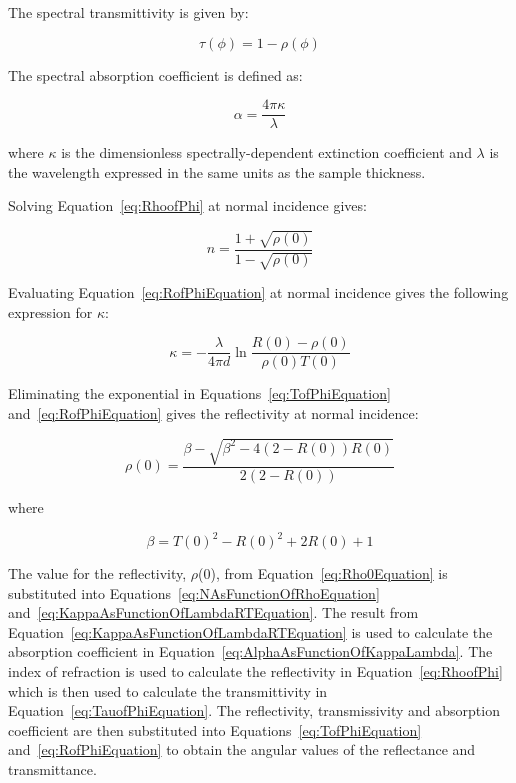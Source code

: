 The spectral transmittivity is given by:

\begin{equation}
\tau (\phi ) = 1 - \rho (\phi )
\label{eq:TauofPhiEquation}
\end{equation}

The spectral absorption coefficient is defined as:

\begin{equation}
\alpha  = \frac{4 \pi \kappa}{\lambda}
\label{eq:AlphaAsFunctionOfKappaLambda}
\end{equation}

where \(\kappa\) is the dimensionless spectrally-dependent extinction coefficient and \(\lambda\) is the wavelength expressed in the same units as the sample thickness.

Solving Equation~\ref{eq:RhoofPhi} at normal incidence gives:

\begin{equation}
n = \frac{{1 + \sqrt {\rho (0)} }}{{1 - \sqrt {\rho (0)} }}
\label{eq:NAsFunctionOfRhoEquation}
\end{equation}

Evaluating Equation~\ref{eq:RofPhiEquation} at normal incidence gives the following expression for \(\kappa\):

\begin{equation}
\kappa  =  - \frac{\lambda }{{4\pi d}}\ln \frac{{R(0) - \rho (0)}}{{\rho (0)T(0)}}
\label{eq:KappaAsFunctionOfLambdaRTEquation}
\end{equation}

Eliminating the exponential in Equations~\ref{eq:TofPhiEquation} and~\ref{eq:RofPhiEquation} gives the reflectivity at normal incidence:

\begin{equation}
\rho (0) = \frac{{\beta  - \sqrt {{\beta ^2} - 4(2 - R(0))R(0)} }}{{2(2 - R(0))}}
\label{eq:Rho0Equation}
\end{equation}

where

\begin{equation}
\beta  = T{(0)^2} - R{(0)^2} + 2R(0) + 1
\end{equation}

The value for the reflectivity, \(\rho\)(0), from Equation~\ref{eq:Rho0Equation} is substituted into Equations~\ref{eq:NAsFunctionOfRhoEquation} and~\ref{eq:KappaAsFunctionOfLambdaRTEquation}. The result from Equation~\ref{eq:KappaAsFunctionOfLambdaRTEquation} is used to calculate the absorption coefficient in Equation~\ref{eq:AlphaAsFunctionOfKappaLambda}. The index of refraction is used to calculate the reflectivity in Equation~\ref{eq:RhoofPhi} which is then used to calculate the transmittivity in Equation~\ref{eq:TauofPhiEquation}. The reflectivity, transmissivity and absorption coefficient are then substituted into Equations~\ref{eq:TofPhiEquation} and~\ref{eq:RofPhiEquation} to obtain the angular values of the reflectance and transmittance.

